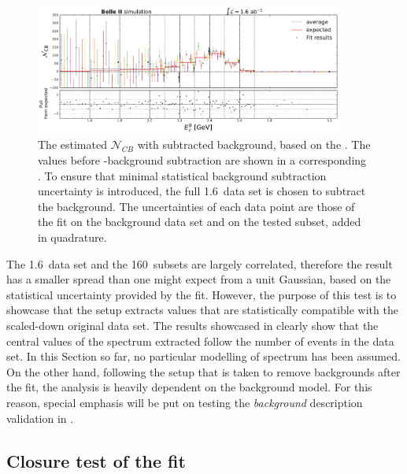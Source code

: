 \begin{figure}[htbp!]
    \includegraphics[width=0.9\textwidth]{figures/mc_validation/subtracted_signal_generic_mc.pdf}
    \caption{\label{fig:subtracted_validation_mc}
    The estimated $\mathcal{N}_{CB}$ with subtracted background, based on the .
    The values before \BB-background subtraction are shown in a corresponding .
    To ensure that minimal statistical background subtraction uncertainty is introduced, the full 1.6~\invab data set is chosen to subtract the background.
    The uncertainties of each data point are those of the \Mbc fit on the background data set and on the tested subset, added in quadrature.
    }
\end{figure}

The 1.6~\invab data set and the 160~\invfb subsets are largely correlated, therefore the result has a smaller spread than one might expect from a unit Gaussian, based on the statistical uncertainty provided by the fit.
However, the purpose of this test is to showcase that the setup extracts values that are statistically compatible with the scaled-down original data set.
The results showcased in  clearly show that the central values of the \EB spectrum extracted follow the number of \BtoXsgamma events in the data set.
In this Section so far, no particular modelling of \BtoXsgamma spectrum has been assumed.
On the other hand, following the setup that is taken to remove \BB backgrounds after the \Mbc fit, the analysis is heavily dependent on the background model.
For this reason, special emphasis will be put on testing the \textit{background} description validation in .

\subsection{Closure test of the \texorpdfstring{\Mbc}{Mbc} fit}\label{sec:closure_test}

